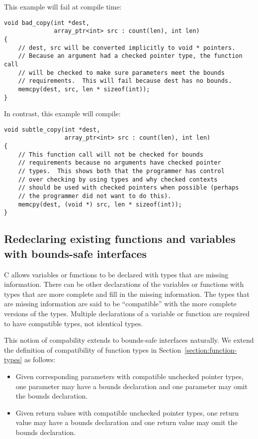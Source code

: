This example will fail at compile time:
\begin{lstlisting}
void bad_copy(int *dest,
              array_ptr<int> src : count(len), int len)
{
    // dest, src will be converted implicitly to void * pointers.
    // Because an argument had a checked pointer type, the function call
    // will be checked to make sure parameters meet the bounds
    // requirements.  This will fail because dest has no bounds.
    memcpy(dest, src, len * sizeof(int));
}
\end{lstlisting}

In contrast, this example will compile:
\begin{lstlisting}
void subtle_copy(int *dest,
                 array_ptr<int> src : count(len), int len)
{
    // This function call will not be checked for bounds
    // requirements because no arguments have checked pointer
    // types.  This shows both that the programmer has control
    // over checking by using types and why checked contexts
    // should be used with checked pointers when possible (perhaps
    // the programmer did not want to do this).
    memcpy(dest, (void *) src, len * sizeof(int));
}
\end{lstlisting}

\subsection{Redeclaring existing functions and variables with bounds-safe interfaces}
\label{section:bounds-safe-interface-redeclaration}

C allows variables or functions to be declared with types that are missing information.
There can be other declarations of the variables or functions with types that are more complete
and fill in the missing information.  The types that are missing information are said to be
``compatible'' with the more complete versions of the types.  Multiple declarations of
a variable or function are required to have compatible types, not identical types.

This notion of compability extends to bounds-safe interfaces naturally.  We extend the
definition of compatibility of function types in Section~\ref{section:function-types} as follows:
\begin{itemize}
\item Given corresponding parameters with compatible unchecked pointer types,
one parameter may have a bounds declaration and one parameter may omit the bounds declaration.
\item Given return values with compatible unchecked pointer types, one
return value may have a bounds declaration and one return value may omit the bounds declaration.
\end{itemize}

